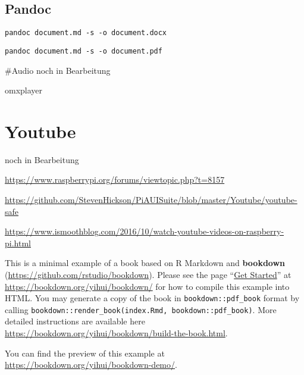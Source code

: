 \documentclass[]{book}
\begin{document}
\hypertarget{pandoc}{%
\section{Pandoc}\label{pandoc}}

\begin{verbatim}
pandoc document.md -s -o document.docx
\end{verbatim}

\begin{verbatim}
pandoc document.md -s -o document.pdf
\end{verbatim}

\#Audio
noch in Bearbeitung

omxplayer

\hypertarget{youtube}{%
\chapter{Youtube}\label{youtube}}

noch in Bearbeitung

\url{https://www.raspberrypi.org/forums/viewtopic.php?t=8157}

\url{https://github.com/StevenHickson/PiAUISuite/blob/master/Youtube/youtube-safe}

\url{https://www.ismoothblog.com/2016/10/watch-youtube-videos-on-raspberry-pi.html}

This is a minimal example of a book based on R Markdown and \textbf{bookdown} (\url{https://github.com/rstudio/bookdown}). Please see the page ``\href{https://bookdown.org/yihui/bookdown/get-started.html}{Get Started}'' at \url{https://bookdown.org/yihui/bookdown/} for how to compile this example into HTML. You may generate a copy of the book in \texttt{bookdown::pdf\_book} format by calling \texttt{bookdown::render\_book(\textquotesingle{}index.Rmd\textquotesingle{},\ \textquotesingle{}bookdown::pdf\_book\textquotesingle{})}. More detailed instructions are available here \url{https://bookdown.org/yihui/bookdown/build-the-book.html}.

You can find the preview of this example at \url{https://bookdown.org/yihui/bookdown-demo/}.


\end{document}
